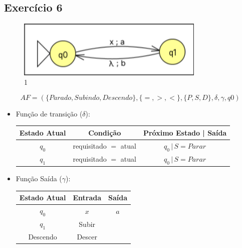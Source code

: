     \subsection{Exercício 6}
        \begin{figure}[H]
            \centering
            \includegraphics[width=0.8\textwidth]{Aula07/Images/Exercicio2.png}
            \caption*{1}
        \end{figure}

        \[AF = (\{Parado, Subindo, Descendo\}, \{=, >, <\}, \{P, S, D\}, \delta, \gamma, q0)\]
        
        \begin{itemize}
            \item Função de transição ($\delta$):
                \begin{center}
                    \begin{tabular}{|c|c|c|}
                        \hline
                        Estado Atual & Condição & Próximo Estado | Saída \\
                        \hline
                        $q_0$ & requisitado $=$ atual & $q_0 \,|\, S = Parar$ \\
                        \hline
                        $q_1$ & requisitado $=$ atual & $q_0 \,|\, S = Parar$ \\
                        \hline  
                    \end{tabular}
                \end{center}
                
            \item Função Saída ($\gamma$):
            \begin{center}
                \begin{tabular}{|c|c|c|}
                    \hline
                    Estado Atual & Entrada & Saída\\
                    \hline
                    $q_0$ & $x$ & $a$\\
                    \hline
                    $q_1$ & Subir\\
                    \hline
                    Descendo & Descer\\
                    \hline
                \end{tabular}
            \end{center}
        \end{itemize}

